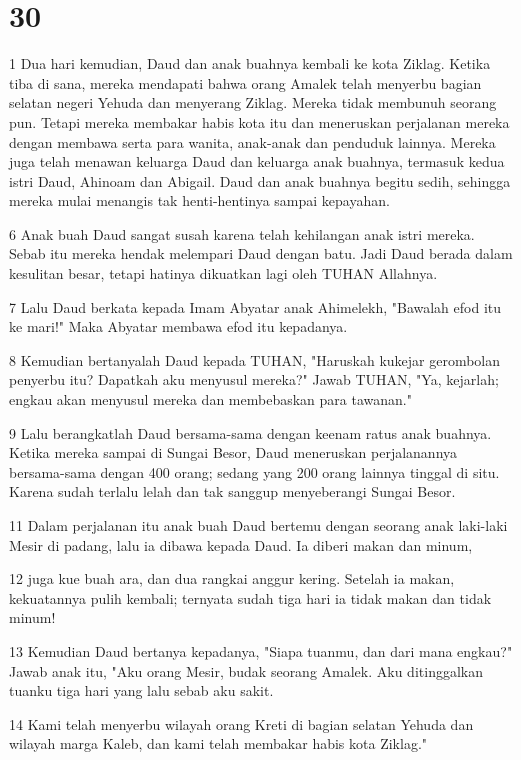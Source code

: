 \chapter{30}

\par 1 Dua hari kemudian, Daud dan anak buahnya kembali ke kota Ziklag. Ketika tiba di sana, mereka mendapati bahwa orang Amalek telah menyerbu bagian selatan negeri Yehuda dan menyerang Ziklag. Mereka tidak membunuh seorang pun. Tetapi mereka membakar habis kota itu dan meneruskan perjalanan mereka dengan membawa serta para wanita, anak-anak dan penduduk lainnya. Mereka juga telah menawan keluarga Daud dan keluarga anak buahnya, termasuk kedua istri Daud, Ahinoam dan Abigail. Daud dan anak buahnya begitu sedih, sehingga mereka mulai menangis tak henti-hentinya sampai kepayahan.
\par 6 Anak buah Daud sangat susah karena telah kehilangan anak istri mereka. Sebab itu mereka hendak melempari Daud dengan batu. Jadi Daud berada dalam kesulitan besar, tetapi hatinya dikuatkan lagi oleh TUHAN Allahnya.
\par 7 Lalu Daud berkata kepada Imam Abyatar anak Ahimelekh, "Bawalah efod itu ke mari!" Maka Abyatar membawa efod itu kepadanya.
\par 8 Kemudian bertanyalah Daud kepada TUHAN, "Haruskah kukejar gerombolan penyerbu itu? Dapatkah aku menyusul mereka?" Jawab TUHAN, "Ya, kejarlah; engkau akan menyusul mereka dan membebaskan para tawanan."
\par 9 Lalu berangkatlah Daud bersama-sama dengan keenam ratus anak buahnya. Ketika mereka sampai di Sungai Besor, Daud meneruskan perjalanannya bersama-sama dengan 400 orang; sedang yang 200 orang lainnya tinggal di situ. Karena sudah terlalu lelah dan tak sanggup menyeberangi Sungai Besor.
\par 11 Dalam perjalanan itu anak buah Daud bertemu dengan seorang anak laki-laki Mesir di padang, lalu ia dibawa kepada Daud. Ia diberi makan dan minum,
\par 12 juga kue buah ara, dan dua rangkai anggur kering. Setelah ia makan, kekuatannya pulih kembali; ternyata sudah tiga hari ia tidak makan dan tidak minum!
\par 13 Kemudian Daud bertanya kepadanya, "Siapa tuanmu, dan dari mana engkau?" Jawab anak itu, "Aku orang Mesir, budak seorang Amalek. Aku ditinggalkan tuanku tiga hari yang lalu sebab aku sakit.
\par 14 Kami telah menyerbu wilayah orang Kreti di bagian selatan Yehuda dan wilayah marga Kaleb, dan kami telah membakar habis kota Ziklag."
